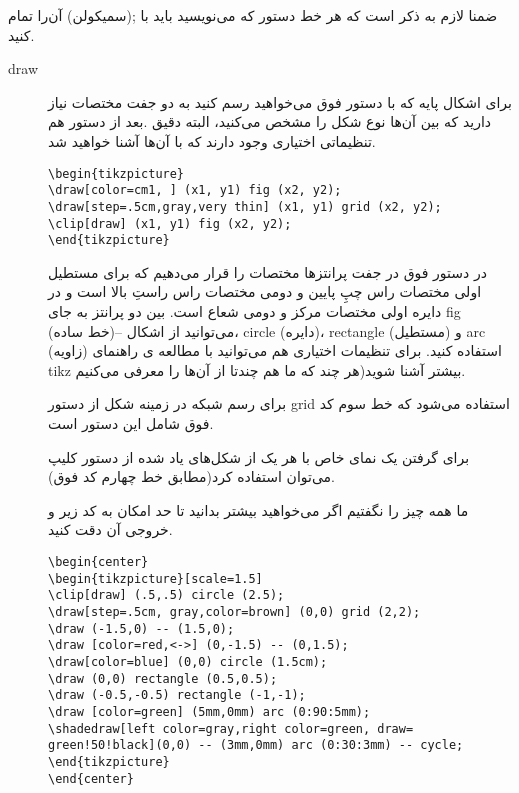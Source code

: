 ضمنا لازم به ذکر است که هر خط دستور که می‌نویسید باید با ;(سمیکولن) آن‌را تمام کنید.

\begin{description}
\item[draw]
برای اشکال پایه که با دستور فوق می‌خواهید رسم کنید به دو جفت مختصات نیاز دارید که بین آن‌ها نوع شکل را مشخص می‌کنید، البته دقیق .بعد از دستور هم تنظیماتی اختیاری وجود دارند که با آن‌ها آشنا خواهید شد.

\begin{latin}
\begin{lstlisting}[frame=trBL]
\begin{tikzpicture}
\draw[color=cm1, ] (x1, y1) fig (x2, y2);
\draw[step=.5cm,gray,very thin] (x1, y1) grid (x2, y2);
\clip[draw] (x1, y1) fig (x2, y2);
\end{tikzpicture}
\end{lstlisting}
\end{latin}

در دستور فوق در جفت پرانتزها مختصات را قرار می‌دهیم که برای مستطیل اولی مختصات راس چپ‌ِ پایین و دومی مختصات راس راستِ بالا است و در دایره اولی مختصات مرکز و دومی شعاع است. بین دو پرانتز به جای fig می‌توانید از اشکال --(خط ساده)، circle (دایره)، rectangle (مستطیل) و arc (زاویه) استفاده کنید. برای تنظیمات اختیاری هم می‌توانید با مطالعه ی ‌‌راهنمای tikz بیشتر آشنا شوید(هر چند که ما هم چندتا از آن‌ها را معرفی می‌کنیم.

برای رسم شبکه در زمینه شکل از دستور grid استفاده می‌شود که خط سوم کد فوق شامل این دستور است.

برای گرفتن یک نمای خاص با هر یک از شکل‌های یاد شده از دستور کلیپ می‌توان استفاده کرد(مطابق خط چهارم کد فوق).

ما همه چیز را نگفتیم اگر می‌خواهید بیشتر بدانید تا حد امکان به کد زیر و خروجی آن دقت کنید.

\begin{latin}
\begin{lstlisting}[frame=trBL]
\begin{center}
\begin{tikzpicture}[scale=1.5]
\clip[draw] (.5,.5) circle (2.5);
\draw[step=.5cm, gray,color=brown] (0,0) grid (2,2);
\draw (-1.5,0) -- (1.5,0);
\draw [color=red,<->] (0,-1.5) -- (0,1.5);
\draw[color=blue] (0,0) circle (1.5cm);
\draw (0,0) rectangle (0.5,0.5);
\draw (-0.5,-0.5) rectangle (-1,-1);
\draw [color=green] (5mm,0mm) arc (0:90:5mm);
\shadedraw[left color=gray,right color=green, draw=
green!50!black](0,0) -- (3mm,0mm) arc (0:30:3mm) -- cycle;
\end{tikzpicture}
\end{center}
\end{lstlisting}
\end{latin}



\end{description}
